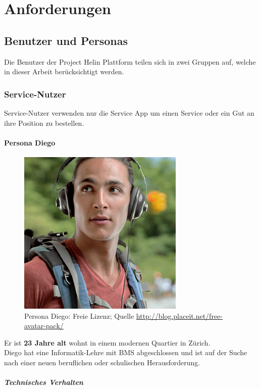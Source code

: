 \chapter{Anforderungen}

\section{Benutzer und Personas}


Die Benutzer der Project Helin Plattform teilen sich in zwei Gruppen auf, welche in dieser Arbeit berücksichtigt werden.

\subsection{Service-Nutzer}

Service-Nutzer verwenden nur die Service App um einen Service oder ein Gut an ihre Position zu bestellen. 

\subsubsection{Persona Diego}

\begin{figure}
\includegraphics[width=.35\textwidth]{images/persona-diego.jpg} 
\caption{Persona Diego: Freie Lizenz; Quelle \url{http://blog.placeit.net/free-avatar-pack/}}
\label{fig:diego}
\end{figure}

Er ist \textbf{23 Jahre alt} wohnt in einem modernen Quartier in Zürich.\\

Diego hat eine Informatik-Lehre mit BMS abgeschlossen und ist auf der Suche nach einer neuen beruflichen oder schulischen Herausforderung.

\paragraph{Technisches Verhalten} 

